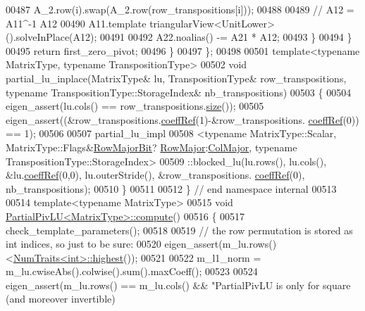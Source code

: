\begin{DoxyCode}
00487           A\_2.row(i).swap(A\_2.row(row\_transpositions[i]));
00488 
00489         \textcolor{comment}{// A12 = A11^-1 A12}
00490         A11.template triangularView<UnitLower>().solveInPlace(A12);
00491 
00492         A22.noalias() -= A21 * A12;
00493       \}
00494     \}
00495     \textcolor{keywordflow}{return} first\_zero\_pivot;
00496   \}
00497 \};
00498 
00501 \textcolor{keyword}{template}<\textcolor{keyword}{typename} MatrixType, \textcolor{keyword}{typename} TranspositionType>
00502 \textcolor{keywordtype}{void} partial\_lu\_inplace(MatrixType& lu, TranspositionType& row\_transpositions, \textcolor{keyword}{typename} 
      TranspositionType::StorageIndex& nb\_transpositions)
00503 \{
00504   eigen\_assert(lu.cols() == row\_transpositions.\hyperlink{class_eigen_1_1_transpositions_base_a6888d6261a9cc24ee8607496e610a5a3}{size}());
00505   eigen\_assert((&row\_transpositions.\hyperlink{class_eigen_1_1_transpositions_base_a97dda1bb4ff8bdd83d8e97af3e590252}{coeffRef}(1)-&row\_transpositions.
      \hyperlink{class_eigen_1_1_transpositions_base_a97dda1bb4ff8bdd83d8e97af3e590252}{coeffRef}(0)) == 1);
00506 
00507   partial\_lu\_impl
00508     <\textcolor{keyword}{typename} MatrixType::Scalar, MatrixType::Flags&\hyperlink{group__flags_gae4f56c2a60bbe4bd2e44c5b19cbe8762}{RowMajorBit}?
      \hyperlink{group__enums_ggaacded1a18ae58b0f554751f6cdf9eb13acfcde9cd8677c5f7caf6bd603666aae3}{RowMajor}:\hyperlink{group__enums_ggaacded1a18ae58b0f554751f6cdf9eb13a0cbd4bdd0abcfc0224c5fcb5e4f6669a}{ColMajor}, \textcolor{keyword}{typename} TranspositionType::StorageIndex>
00509     ::blocked\_lu(lu.rows(), lu.cols(), &lu.\hyperlink{class_eigen_1_1_plain_object_base_a25626a55b26a4323565f79d1b7c48ea8}{coeffRef}(0,0), lu.outerStride(), &row\_transpositions.
      \hyperlink{class_eigen_1_1_transpositions_base_a97dda1bb4ff8bdd83d8e97af3e590252}{coeffRef}(0), nb\_transpositions);
00510 \}
00511 
00512 \} \textcolor{comment}{// end namespace internal}
00513 
00514 \textcolor{keyword}{template}<\textcolor{keyword}{typename} MatrixType>
00515 \textcolor{keywordtype}{void} \hyperlink{group___l_u___module_class_eigen_1_1_partial_piv_l_u}{PartialPivLU<MatrixType>::compute}()
00516 \{
00517   check\_template\_parameters();
00518 
00519   \textcolor{comment}{// the row permutation is stored as int indices, so just to be sure:}
00520   eigen\_assert(m\_lu.rows()<\hyperlink{group___core___module_struct_eigen_1_1_num_traits}{NumTraits<int>::highest}());
00521 
00522   m\_l1\_norm = m\_lu.cwiseAbs().colwise().sum().maxCoeff();
00523 
00524   eigen\_assert(m\_lu.rows() == m\_lu.cols() && \textcolor{stringliteral}{"PartialPivLU is only for square (and moreover invertible)
}
\end{DoxyCode}
